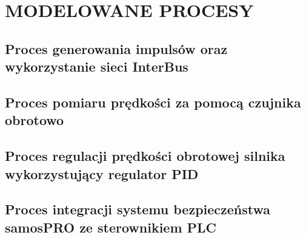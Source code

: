 \chapter{MODELOWANE PROCESY}
\section{Proces generowania impulsów oraz wykorzystanie sieci InterBus}

\section{Proces pomiaru prędkości za pomocą czujnika obrotowo}
\section{Proces regulacji prędkości obrotowej silnika wykorzystujący regulator PID}

\section{Proces integracji systemu bezpieczeństwa samosPRO ze sterownikiem PLC}
